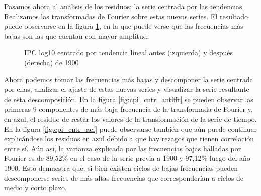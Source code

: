 \documentclass[a4paper]{article}
\begin{document}
Pasamos ahora al análisis de los residuos: la serie centrada por las tendencias. Realizamos las transformadas de Fourier sobre estas nuevas series. El resultado puede observarse en la figura \ref{fig:cpi_log10_cntr_fft}, en la que puede verse que las frecuencias más bajas son las que cuentan con mayor amplitud.

\begin{figure}[H]
	\centering
	\caption{IPC log10 centrado por tendencia lineal antes (izquierda) y después (derecha) de 1900} 	
	\label{fig:cpi_log10_cntr_fft}
\end{figure}

Ahora podemos tomar las frecuencias más bajas y descomponer la serie centrada por ellas, analizar el ajuste de estas nuevas series y visualizar la serie resultante de esta descomposición. En la figura \ref{fig:cpi_cntr_antifft} se pueden observar las primeras 9 componentes de más baja frecuencia de la transformada de Fourier y, en azul, el residuo de restar los valores de la transformación de la serie de tiempo. En la figura \ref{fig:cpi_cntr_acf} puede observarse también que aún puede continuar explicándose los residuos en azul debido a que hay rezagos que tienen correlación entre sí. Aún así, la varianza explicada por las frecuencias bajas halladas por Fourier es de 89,52\% en el caso de la serie previa a 1900 y 97,12\% luego del año 1900. Esto demuestra que, si bien existen ciclos de bajas frecuencias pueden descomponerse series de más altas frecuencias que corresponderían a ciclos de medio y corto plazo.
\end{document}
